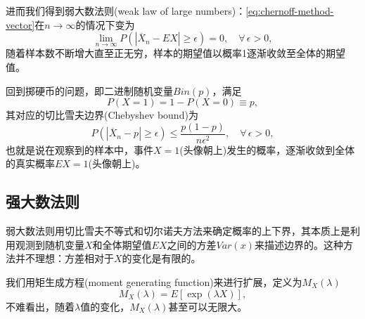 进而我们得到弱大数法则(weak law of large numbers)：\eqref{eq:chernoff-method-vector}在$n \rightarrow \infty$的情况下变为
\begin{equation}[弱大数法则]
  \label{eq:lln-wlln}
  \lim_{n \rightarrow \infty} P \left( \left| \overline{X}_{n} - E X \right| \ge \epsilon  \right) = 0, \quad \forall \, \epsilon > 0,
\end{equation}
随着样本数不断增大直至正无穷，样本的期望值以概率1逐渐收敛至全体的期望值。

回到掷硬币的问题，即二进制随机变量$Bin(p)$，满足
\begin{equation}
  P \left( X = 1 \right) = 1 - P \left( X = 0 \right) \equiv p,
\end{equation}
其对应的切比雪夫边界(Chebyshev bound)为
\begin{equation*}
  P \left(
  \left| \overline{X}_{n} - p \right| \ge \epsilon
  \right) \le \frac{p \left( 1 - p \right)}{n \epsilon^{2}}, \quad \forall \, \epsilon > 0,
\end{equation*}
也就是说在观察到的样本中，事件$X=1$(头像朝上)发生的概率，逐渐收敛到全体的真实概率$EX=1$(头像朝上)。

\subsection{强大数法则}
\label{sec:lln-slln}
弱大数法则用切比雪夫不等式和切尔诺夫方法来确定概率的上下界，其本质上是利用观测到随机变量$X$和全体期望值$EX$之间的方差$Var(x)$来描述边界的。这种方法并不理想：方差相对于$X$的变化是有限的。

我们用矩生成方程(moment generating function)来进行扩展，定义为$M_{X} \left( \lambda \right)$
\begin{equation}
  \label{eq:lln-slln-mgf}
  M_{X} \left( \lambda \right) = E \left[ \exp \left( \lambda X \right) \right],
\end{equation}
不难看出，随着$\lambda$值的变化，$M_{X} \left( \lambda \right)$甚至可以无限大。

